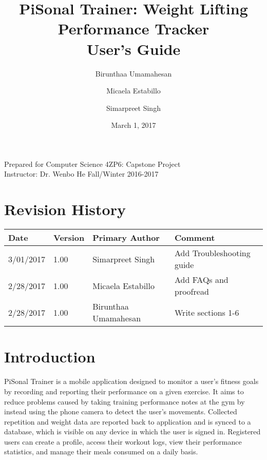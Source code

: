 \documentclass{article}
\title{
PiSonal Trainer: Weight Lifting Performance Tracker\\
\Large {User's Guide}
}
\date{March 1, 2017}
\author{Birunthaa Umamahesan \and Micaela Estabillo \and Simarpreet Singh}
\begin{document}
\thispagestyle{plain}
\maketitle
\vfill
\begin{center}
    Prepared for Computer Science 4ZP6: Capstone Project \\
    Instructor: Dr. Wenbo He
    Fall/Winter 2016-2017\\
\end{center}
\newpage

\tableofcontents

\listoffigures

\listoftables

\thispagestyle{plain}

\newpage

\section*{Revision History}
\begingroup
\begin{tabular}{ | p{2cm} | p{1.5cm} | p{3.8cm} | p{7cm} |} 
    \hline
    \textbf{Date} & \textbf{Version} & \textbf{Primary Author} & \textbf{Comment}\\
    \hline
    3/01/2017 & 1.00 & Simarpreet Singh & Add Troubleshooting guide \\
    \hline
    2/28/2017 & 1.00 & Micaela Estabillo & Add FAQs and proofread\\
    \hline
    2/28/2017 & 1.00 & Birunthaa Umamahesan & Write sections 1-6\\
    \hline
\end{tabular}
\endgroup


\begin{center}
\end{center}

\newpage

\clearpage
\setcounter{page}{1}

% 

\section{Introduction}
PiSonal Trainer is a mobile application designed to monitor a user's fitness goals by recording and reporting their performance on a given exercise. It aims to reduce problems caused by taking training performance notes at the gym by instead using the phone camera to detect the user's movements. Collected repetition and weight data are reported back to application and is synced to a database, which is visible on any device in which the user is signed in. Registered users can create a profile, access their workout logs, view their performance statistics, and manage their meals consumed on a daily basis.
\end{document}
